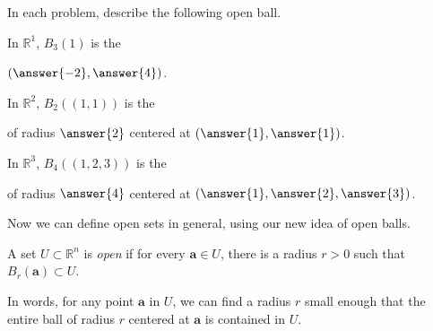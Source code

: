 \documentclass{ximera}
\begin{document}
In each problem, describe the following open ball.

\begin{problem}
In $\mathbb{R}^1$, $B_3(1)$ is the \begin{multipleChoice}
\end{multipleChoice}  \begin{problem}$(\answer{-2},\answer{4})$.\end{problem}
\end{problem} 
 
 \begin{problem}
 In $\mathbb{R}^2$, $B_2((1,1))$ is the \begin{multipleChoice}
\end{multipleChoice} \begin{problem}of radius $\answer{2}$ centered at $(\answer{1}, \answer{1})$.\end{problem}
\end{problem}

\begin{problem}
In $\mathbb{R}^3$, $B_4((1,2,3))$ is the \begin{multipleChoice}
\end{multipleChoice} \begin{problem} of radius $\answer{4}$ centered at $(\answer{1}, \answer{2}, \answer{3})$.\end{problem}
\end{problem}


Now we can define open sets in general, using our new idea of open balls.

\begin{definition}
A set $U\subset \mathbb{R}^n$ is \emph{open} if for every $\mathbf{a}\in U$, there is a radius $r>0$ such that $B_r(\mathbf{a})\subset U$.
\end{definition}

In words, for any point $\mathbf{a}$ in $U$, we can find a radius $r$ small enough that the entire ball of radius $r$ centered at $\mathbf{a}$ is contained in $U$.

\end{document}
